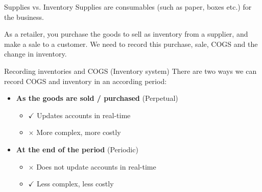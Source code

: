 \begin{knBox}
    {Supplies vs. Inventory}
    Supplies are consumables (such as paper, boxes etc.) for the business.
\end{knBox}

As a retailer, you purchase the goods to sell as inventory from a supplier, and make a sale to a customer. We need to record this purchase, sale, COGS and the change in inventory.

\begin{theorem}
    {Recording inventories and COGS (Inventory system)}
    There are two ways we can record COGS and inventory in an according period:
    \begin{itemize}
        \item \textbf{As the goods are sold / purchased} (Perpetual)
              \begin{itemize}
                  \item[] $\checkmark$ Updates accounts in real-time
                  \item[] $\times$ More complex, more costly
              \end{itemize}
        \item \textbf{At the end of the period} (Periodic)
              \begin{itemize}
                  \item[] $\times$ Does not update accounts in real-time
                  \item[] $\checkmark$ Less complex, less costly
              \end{itemize}
    \end{itemize}
\end{theorem}


